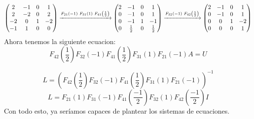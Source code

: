 \[
        \begin{pmatrix}
                2  & -1 & 0 & 1  \\
                2  & -2 & 0 & 2  \\
                -2 & 0  & 1 & -2 \\
                -1 & 1  & 0 & 0
        \end{pmatrix}
        \xrightarrow[]{F_{21}(-1) \hspace{1mm} F_{31}(1) \hspace{1mm} F_{41}\left ( \frac{1}{2} \right )}
        \begin{pmatrix}
                2 & -1          & 0 & 1           \\
                0 & -1          & 0 & 1           \\
                0 & -1          & 1 & -1          \\
                0 & \frac{1}{2} & 0 & \frac{1}{2}
        \end{pmatrix}
        \xrightarrow[]{F_{32}(-1) \hspace{1mm} F_{42}\left ( \frac{1}{2} \right )}
        \begin{pmatrix}
                2 & -1 & 0 & 1  \\
                0 & -1 & 0 & 1  \\
                0 & 0  & 1 & -2 \\
                0 & 0  & 0 & 1
        \end{pmatrix}
\]
Ahora tenemos la siguiente ecuacion:
\[F_{42}\left ( \frac{1}{2} \right )F_{32}(-1)F_{41}\left ( \frac{1}{2} \right )F_{31}(1)F_{21}(-1)A = U\]

\[
        L = (F_{42}\left ( \frac{1}{2} \right )F_{32}(-1)F_{41}\left ( \frac{1}{2} \right )F_{31}(1)F_{21}(-1))^{-1}\]
\[L = F_{21}(1)F_{31}(-1)F_{41}\left ( \frac{-1}{2} \right ) F_{32}(1)F_{42}\left ( \frac{-1}{2} \right ) I\]
Con todo esto, ya seríamos capaces de plantear los sistemas de ecuaciones.
